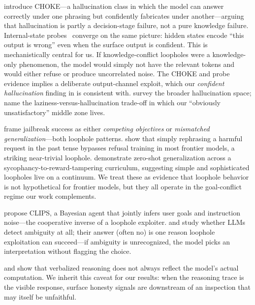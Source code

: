  \citet{simhi2025choke} introduce CHOKE---a hallucination class in which the model can answer correctly under one phrasing but confidently fabricates under another---arguing that hallucination is partly a decision-stage failure, not a pure knowledge failure. Internal-state probes~\citep{azaria2023internal, orgad2024llmsknow, kossen2024semantic, duan2024hidden} converge on the same picture: hidden states encode ``this output is wrong'' even when the surface output is confident. This is mechanistically central for us. If knowledge-conflict loopholes were a knowledge-only phenomenon, the model would simply not have the relevant tokens and would either refuse or produce uncorrelated noise. The CHOKE and probe evidence implies a deliberate output-channel exploit, which our \emph{confident hallucination} finding in \kcl is consistent with. \citet{zhang2023sirens} survey the broader hallucination space; \citet{zhao2024curriculum} name the laziness-versus-hallucination trade-off in which our ``obviously unsatisfactory'' middle zone lives.

 \citet{wei2023jailbroken} frame jailbreak success as either \emph{competing objectives} or \emph{mismatched generalization}---both loophole patterns. \citet{andriushchenko2024pasttense} show that simply rephrasing a harmful request in the past tense bypasses refusal training in most frontier models, a striking near-trivial loophole. \citet{denison2024subterfuge} demonstrate zero-shot generalization across a sycophancy-to-reward-tampering curriculum, suggesting simple and sophisticated loopholes live on a continuum. We treat these as evidence that loophole behavior is not hypothetical for frontier models, but they all operate in the goal-conflict regime our work complements.

 \citet{zhixuan2024clips} propose CLIPS, a Bayesian agent that jointly infers user goals and instruction noise---the cooperative inverse of a loophole exploiter. \citet{liu2023ambiguity} and \citet{stengel2024zero} study whether LLMs detect ambiguity at all; their answer (often no) is one reason loophole exploitation can succeed---if ambiguity is unrecognized, the model picks an interpretation without flagging the choice.

 \citet{turpin2023cot} and \citet{barez2025cot} show that verbalized reasoning does not always reflect the model's actual computation. We inherit this caveat for our \rseventy results: when the reasoning trace is the visible response, surface honesty signals are downstream of an inspection that may itself be unfaithful.

